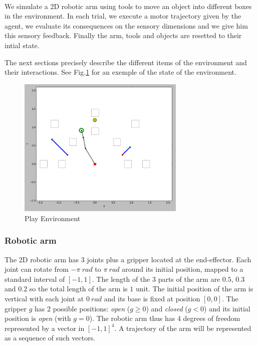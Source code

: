 \documentclass[10pt,letterpaper]{article}
\begin{document}
		\paragraph{}
		We simulate a 2D robotic arm using tools to move an object into different boxes in the environment. 		
		In each trial, we execute a motor trajectory given by the agent, we evaluate its consequences on the sensory dimensions and we give him
		this sensory feedback. Finally the arm, tools and objects are resetted to their intial state.
		
		The next sections precisely describe the different items of the environment and their interactions.	
		See Fig.\ref{env} for an exemple of the state of the environment. 
		
		\begin{figure}[h]
			\centering
			\includegraphics[width=8cm]{./include/tools.png}
			\caption{Play Environment}
			\label{env}
		\end{figure}
			

		\subsubsection{Robotic arm}
		
			The 2D robotic arm has 3 joints plus a gripper located at the end-effector.
			Each joint can rotate from $-\pi~rad$ to $\pi~rad$ around its initial position, mapped to a standard interval of $[-1,1]$.
			The length of the 3 parts of the arm are $0.5$, $0.3$ and $0.2$ so the total length of the arm is $1$ unit.
			The initial position of the arm is vertical with each joint at $0~rad$ and its base is fixed at position $[0, 0]$.
			The gripper $g$ has 2 possible positions: \textit{open} ($g \geq 0$) and \textit{closed} ($g < 0$) and its initial position is \textit{open} (with $g = 0$).
			The robotic arm thus has 4 degrees of freedom represented by a vector in $[-1,1]^4$.
			A trajectory of the arm will be represented as a sequence of such vectors.\\
		
\end{document}

